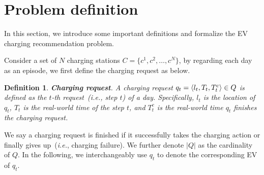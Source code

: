 \documentclass[sigconf]{acmart}
\newcommand{\ie}{\emph{i.e.},\xspace}
\newtheorem{defi}{Definition}
\begin{document}
\section{Problem definition}\label{sec:preliminary}
In this section, we introduce some important definitions and formalize the EV charging recommendation problem. 

Consider a set of $N$ charging stations $C=\{c^1,c^2,\dots,c^N\}$, by regarding each day as an episode, we first define the charging request as below.
\begin{defi}
	\textbf{Charging request}. A charging request $q_t =\langle l_t, \\T_t, T^c_t \rangle \in Q$ is defined as the $t$-th request~(\ie step $t$) of a day. 
	Specifically, $l_t$ is the location of $q_t$, $T_t$ is the real-world time of the step $t$, and $T_t^c$ is the real-world time $q_t$ finishes the charging request. 
\end{defi}
We say a charging request is finished if it successfully takes the charging action or finally gives up~(\ie charging failure). We further denote $|Q|$ as the cardinality of $Q$.
In the following, we interchangeably use $q_t$ to denote the corresponding EV of $q_t$.
\end{document}
